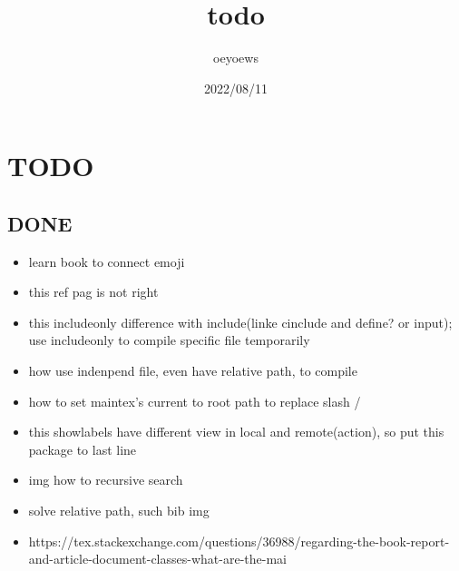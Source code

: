\documentclass[UTF8]{article}
\title{todo \emoji{check-mark-button}}
\author{oeyoews}
\date{2022/08/11}
\begin{document}
\maketitle

\section{ TODO }%
\label{sec:TODO}

\subsection{ DONE}%
\label{sec:DONE}

\begin{itemize}
	\item learn book to connect emoji
	\item this ref pag is not right
	\item this includeonly difference with include(linke cinclude and define? or
    input); use includeonly to compile specific file temporarily
	\item how use indenpend file, even have relative path, to compile
	\item how to set maintex's current to root path to replace slash /
	\item this showlabels have different view in local and remote(action), so put
	      this package to last line
	\item img how to recursive search
	\item solve relative path, such bib img
	\item https://tex.stackexchange.com/questions/36988/regarding-the-book-report-and-article-document-classes-what-are-the-mai
\end{itemize}
\end{document}

